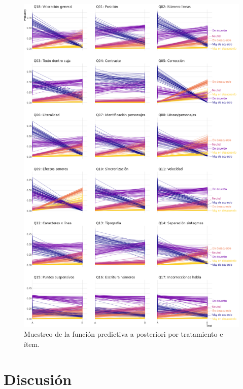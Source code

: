 \documentclass[
  12pt,
  a4paper,
  extrafontsizes,
  onecolumn,
  openright,
  table]{memoir}
\begin{document}
\begin{figure}[h]

{\centering \includegraphics[width=1\textwidth,height=\textheight]{images/bayes-preg.png}

}

\caption{\label{fig-pred-3}Muestreo de la función predictiva a
posteriori por tratamiento e ítem.}

\end{figure}


\hypertarget{sec-discusion}{%
\chapter{Discusión}\label{sec-discusion}}
\end{document}
